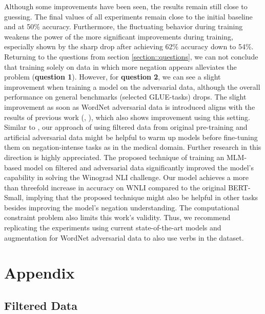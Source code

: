 \documentclass{article}
\begin{document}
Although some improvements have been seen, the results remain still close to guessing. The final values of all experiments remain close to the initial baseline and at 50\% accuracy. Furthermore, the fluctuating behavior during training weakens the power of the more significant improvements during training, especially shown by the sharp drop after achieving 62\% accuracy down to 54\%.
Returning to the questions from section \ref{section::questions}, we can not conclude that training solely on data in which more negation appears alleviates the problem (\textbf{question 1}). However, for \textbf{question 2}, we can see a slight improvement when training a model on the adversarial data, although the overall performance on general benchmarks (selected GLUE-tasks) drops.
The slight improvement as soon as WordNet adversarial data is introduced aligns with the results of previous work (\cite{kassner-schutze-2020-negated}, \cite{hosseini-etal-2021-understanding}), which also shows improvement using this setting. Similar to \cite{TruongImprovingNegation2022}, our approach of using filtered data from original pre-training and artificial adversarial data might be helpful to warm up models before fine-tuning them on negation-intense tasks as in the medical domain. Further research in this direction is highly appreciated.
The proposed technique of training an MLM-based model on filtered and adversarial data significantly improved the model's capability in solving the Winograd NLI challenge. Our model achieves a more than threefold increase in accuracy on WNLI compared to the original BERT-Small, implying that the proposed technique might also be helpful in other tasks besides improving the model's negation understanding.
The computational constraint problem also limits this work's validity. Thus, we recommend replicating the experiments using current state-of-the-art models and augmentation for WordNet adversarial data to also use verbs in the dataset.





\appendix


\section{Appendix}

\subsection{Filtered Data}
\end{document}
